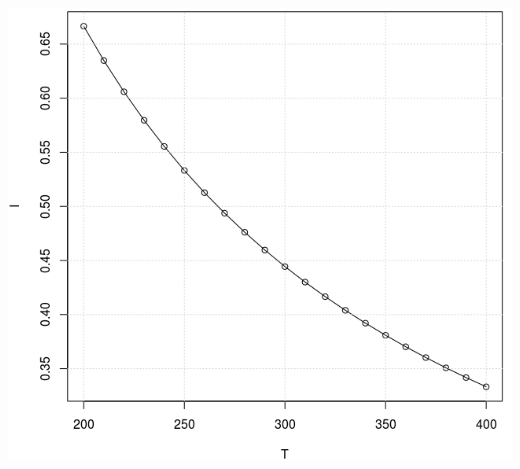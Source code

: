 \documentclass[14pt]{extreport}
\begin{document}
\newpage
\begin{landscape}
\begin{center}
\includegraphics[width=15cm, height=15cm]{lat.png}
\end{center}
\end{landscape}
\end{document}
